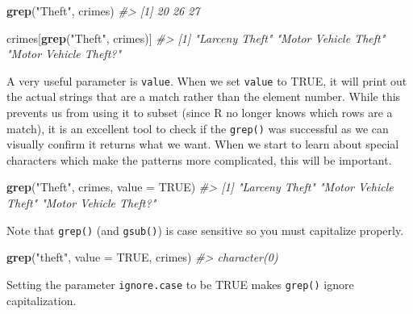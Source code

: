 \documentclass[
  12pt,
]{book}
\newenvironment{Shaded}{\begin{snugshade}}{\end{snugshade}}
\newcommand{\CommentTok}[1]{\textcolor[rgb]{0.37,0.37,0.37}{\textit{#1}}}
\newcommand{\DataTypeTok}[1]{\textcolor[rgb]{0.27,0.27,0.27}{#1}}
\newcommand{\KeywordTok}[1]{\textcolor[rgb]{0.27,0.27,0.27}{\textbf{#1}}}
\newcommand{\NormalTok}[1]{#1}
\newcommand{\OtherTok}[1]{\textcolor[rgb]{0.37,0.37,0.37}{#1}}
\newcommand{\StringTok}[1]{\textcolor[rgb]{0.5,0.5,0.5}{#1}}
\begin{document}
\begin{Shaded}
\begin{Highlighting}[]
\KeywordTok{grep}\NormalTok{(}\StringTok{"Theft"}\NormalTok{, crimes)}
\CommentTok{\#\textgreater{} [1] 20 26 27}
\end{Highlighting}
\end{Shaded}

\begin{Shaded}
\begin{Highlighting}[]
\NormalTok{crimes[}\KeywordTok{grep}\NormalTok{(}\StringTok{"Theft"}\NormalTok{, crimes)]}
\CommentTok{\#\textgreater{} [1] "Larceny Theft"        "Motor Vehicle Theft"  "Motor Vehicle Theft?"}
\end{Highlighting}
\end{Shaded}

A very useful parameter is \texttt{value}. When we set \texttt{value} to TRUE, it will print out the actual strings that are a match rather than the element number. While this prevents us from using it to subset (since R no longer knows which rows are a match), it is an excellent tool to check if the \texttt{grep()} was successful as we can visually confirm it returns what we want. When we start to learn about special characters which make the patterns more complicated, this will be important.

\begin{Shaded}
\begin{Highlighting}[]
\KeywordTok{grep}\NormalTok{(}\StringTok{"Theft"}\NormalTok{, crimes, }\DataTypeTok{value =} \OtherTok{TRUE}\NormalTok{)}
\CommentTok{\#\textgreater{} [1] "Larceny Theft"        "Motor Vehicle Theft"  "Motor Vehicle Theft?"}
\end{Highlighting}
\end{Shaded}

Note that \texttt{grep()} (and \texttt{gsub()}) is case sensitive so you must capitalize properly.

\begin{Shaded}
\begin{Highlighting}[]
\KeywordTok{grep}\NormalTok{(}\StringTok{"theft"}\NormalTok{, }\DataTypeTok{value =} \OtherTok{TRUE}\NormalTok{, crimes)}
\CommentTok{\#\textgreater{} character(0)}
\end{Highlighting}
\end{Shaded}

Setting the parameter \texttt{ignore.case} to be TRUE makes \texttt{grep()} ignore capitalization.
\end{document}
